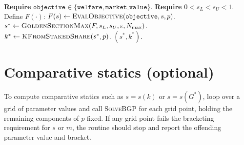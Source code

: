 \documentclass[11pt]{article}
\begin{document}
\begin{algorithm}[H]
\caption{\textsc{SolveOptimalPolicy}$(\texttt{objective},p,[s_L,s_U],\varepsilon,N_{\max})$}
\begin{algorithmic}[1]
\State \textbf{Require} $\texttt{objective}\in\{\texttt{welfare},\texttt{market\_value}\}$.
\State \textbf{Require} $0<s_L<s_U<1$.
\State Define $F(\cdot)$:
\State $F(s)\gets \textsc{EvalObjective}(\texttt{objective},s,p)$.
\State $s^* \gets \textsc{GoldenSectionMax}(F,s_L,s_U,\varepsilon,N_{\max})$.
\State $k^* \gets \textsc{KFromStakedShare}(s^*,p)$.
\State \Return $(s^*,k^*)$.
\end{algorithmic}
\end{algorithm}

\section{Comparative statics (optional)}
To compute comparative statics such as $s=s(k)$ or $s=s(G^*)$, loop over a grid of parameter values and call \textsc{SolveBGP} for each grid point, holding the remaining components of $p$ fixed.
If any grid point fails the bracketing requirement for $s$ or $m$, the routine should stop and report the offending parameter value and bracket.
\end{document}
